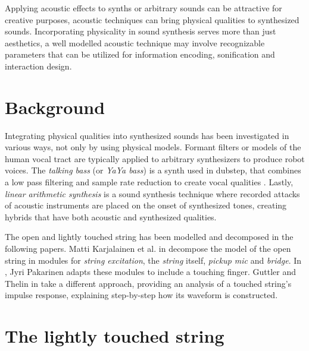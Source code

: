 \documentclass{sigchi}
\begin{document}
Applying acoustic effects to synths or arbitrary sounds can be attractive for creative purposes, acoustic techniques can bring physical qualities to synthesized sounds.
Incorporating physicality in sound synthesis serves more than just aesthetics, a well modelled acoustic technique may involve recognizable parameters that can be utilized for information encoding, sonification and interaction design.

\section{Background}
Integrating physical qualities into synthesized sounds has been investigated in various ways, not only by using physical models.
Formant filters or models of the human vocal tract are typically applied to arbitrary synthesizers to produce robot voices.
The \textit{talking bass} (or \textit{YaYa bass}) is a synth used in dubstep, that combines a low pass filtering and sample rate reduction to create vocal qualities \cite{audio_digital_how_2014, dorincourt_reason_2010}.
Lastly, \textit{linear arithmetic synthesis} \cite{russ_l_1987} is a sound synthesis technique where recorded attacks of acoustic instruments are placed on the onset of synthesized tones, creating hybrids that have both acoustic and synthesized qualities.

The open and lightly touched string has been modelled and decomposed in the following papers.
Matti Karjalainen et al. in \cite{karjalainen_plucked-string_1998} decompose the model of the open string in modules for \textit{string excitation}, the \textit{string} itself, \textit{pickup mic} and \textit{bridge}.
In \cite{pakarinen_physical_2005}, Jyri Pakarinen adapts these modules to include a touching finger.
Guttler and Thelin in \cite{guettler_bowed-string_2012} take a different approach, providing an analysis of a touched string's impulse response, explaining step-by-step how its waveform is constructed.

\section{The lightly touched string}
\end{document}
